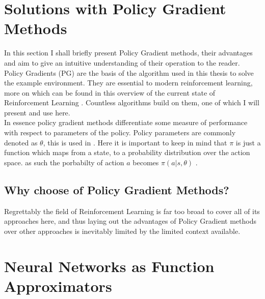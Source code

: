 \section{Solutions with Policy Gradient Methods}\label{sec:policy_gradient}
\noindent
In this section I shall briefly present Policy Gradient methods, their advantages and aim to give an intuitive understanding of their operation to the reader.
Policy Gradients (PG) are the basis of the algorithm used in this thesis to solve the example environment. They are essential to modern reinforcement learning, more on which can be found in this overview of the current state of Reinforcement Learning \cite{grigsby_overview_2018}. Countless algorithms build on them, one of which I will present and use here.
\\ In essence policy gradient methods differentiate some measure of performance with respect to parameters of the policy. Policy parameters are commonly denoted as $\theta$, this is used in \cite{sutton_reinforcement_2018}. Here it is important to keep in mind that $\pi$ is just a function which maps from a state, to a probability distribution over the action space. as such the porbabilty of action $a$ becomes $\pi(a|s, \theta)$ .

\subsection{Why choose of Policy Gradient Methods?}\label{subsec:advantages_of_policy_gradient}
\noindent
Regrettably the field of Reinforcement Learning is far too broad to cover all of its approaches here, and thus laying out the advantages of Policy Gradient methods over other approaches is inevitably limited by the limited context available. 

\newpage
\section{Neural Networks as Function Approximators}\label{sec:neural_networks}